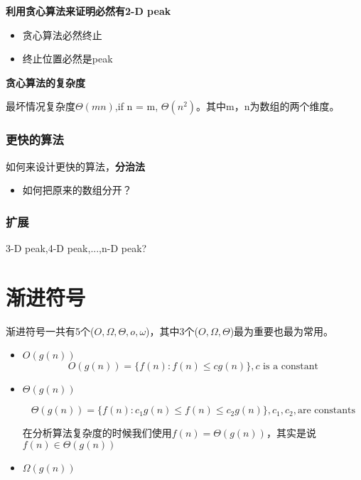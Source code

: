 \documentclass[11pt]{article}
\begin{document}
\begin{CJK}{UTF8}{gbsn}
\textbf{利用贪心算法来证明必然有2-D peak}

\begin{itemize}
\item 贪心算法必然终止
\item 终止位置必然是peak
\end{itemize}

\textbf{贪心算法的复杂度}

最坏情况复杂度$\Theta(mn)$,if n = m, $\Theta(n^2)$。其中m，n为数组的两个维度。

\subsubsection{更快的算法}

如何来设计更快的算法，\textbf{分治法}

\begin{itemize}
\item 如何把原来的数组分开？
  
\end{itemize}

\subsubsection{扩展}

3-D peak,4-D peak,...,n-D peak?

\section{渐进符号}

渐进符号一共有5个($O,\Omega,\Theta, o, \omega$)，其中3个($O,\Omega,\Theta$)最为重要也最为常用。

\begin{itemize}
\item $O(g(n))$
  \begin{displaymath}
    O(g(n))=\{f(n): f(n) \leqslant c g(n)\},c\mbox{ is a constant}
  \end{displaymath}

\item $\Theta(g(n))$

  \begin{displaymath}
    \Theta(g(n))=\{f(n):c_1g(n)\leqslant f(n) \leqslant c_2 g(n)\},c_1,c_2,\mbox{are constants}
  \end{displaymath}

  在分析算法复杂度的时候我们使用$f(n)=\Theta(g(n))$，其实是说$f(n)\in \Theta(g(n))$

\item $\Omega(g(n))$


\end{itemize}
\end{CJK}
\end{document}
